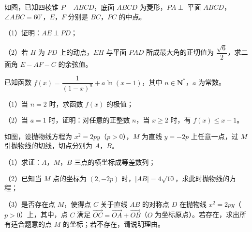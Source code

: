\begin{question}
如图，已知四棱锥 $P-ABCD$，底面 $ABCD$ 为菱形，$PA\perp$ 平面 $ABCD$，$\angle ABC=60^\circ$，$E$，$F$ 分别是 $BC$，$PC$ 的中点。

（1）证明：$AE\perp PD$；

（2）若 $H$ 为 $PD$ 上的动点，$EH$ 与平面 $PAD$ 所成最大角的正切值为 $\dfrac{\sqrt6}2$，求二面角 $E-AF-C$ 的余弦值。
\nopagebreak[4]
\begin{center}\end{center}
\nopagebreak[4]
\end{question}
\endgroup
\begin{question}
已知函数 $f(x)=\dfrac1{(1-x)^n}+a\ln(x-1)$，其中 $n\in\mathbf N^*$，$a$ 为常数。

（1）当 $n=2$ 时，求函数 $f(x)$ 的极值；

（2）当 $a=1$ 时，证明：对任意的正整数 $n$，当 $x\geqslant2$ 时，有 $f(x)\leqslant x-1$。

\Needspace{0.4\textheight}
\end{question}
\begingroup
\renewenvironment{question}{\Needspace{0.46\textheight}}{}
\begin{question}
如图，设抛物线方程为 $x^2=2py$（$p>0$），$M$ 为直线 $y=-2p$ 上任意一点，过 $M$ 引抛物线的切线，切点分别为 $A$，$B$。

（1）求证：$A$，$M$，$B$ 三点的横坐标成等差数列；

（2）已知当 $M$ 点的坐标为 $(2,-2p)$ 时，$|AB|=4\sqrt{10}$，求此时抛物线的方程；

（3）是否存在点 $M$，使得点 $C$ 关于直线 $AB$ 的对称点 $D$ 在抛物线 $x^2=2py$（$p>0$）上，其中，点 $C$ 满足 $\overrightarrow{OC}=\overrightarrow{OA}+\overrightarrow{OB}$（$O$ 为坐标原点）。若存在，求出所有适合题意的点 $M$ 的坐标；若不存在，请说明理由。
\nopagebreak[4]
\begin{center}\end{center}
\nopagebreak[4]

\end{question}
\endgroup